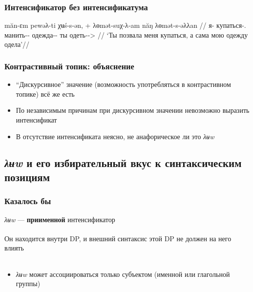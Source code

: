 \documentclass{beamer}
\begin{document}
\begin{frame}
    \frametitle{Интенсификатор без интенсификатума}

    \ex
    \begingl
        \gla măn-ɛm pewəλ-ti χʉś-s-ən, + λɵmət-suχ-λ-am năŋ λɵmət-s-əλλan //
        \glb я-\Dat{} купаться-\Nfin.\Npst{} манить-\Pst-\Ssg{} одежда-\Pl-\Fsg{} ты одеть-\Pst-\Ssg>\Pl{}        //
        \glft ‘Ты позвала меня купаться, а сама мою одежду одела’\trailingcitation{[Дядюн 2016]}//
    \endgl
    \xe

\end{frame}

\begin{frame}
    \frametitle{Контрастивный топик: объяснение}

    \begin{itemize}
        \item “Дискурсивное” значение (возможность употребляться в контрастивном топике) всё же есть
        \item По независимым причинам при дискурсивном значении невозможно выразить интенсификат
        \item В отсутствие интенсификата неясно, не анафорическое ли это \textit{λʉw}
    \end{itemize}
\end{frame}


\subsection{\textit{λʉw} и его избирательный вкус к синтаксическим позициям}

\begin{frame}
    \frametitle{Казалось бы}

    \textit{λʉw} — \textbf{приименной} интенсификатор\\~\\
    
    Он находится внутри DP, и внешний синтаксис этой DP не должен на него влиять\\~\\
    
    \pause
    
    
    \begin{itemize}
        \item \textit{λʉw} может ассоциироваться только субъектом (именной или глагольной группы)
    \end{itemize}    

\end{frame}    
\end{document}
